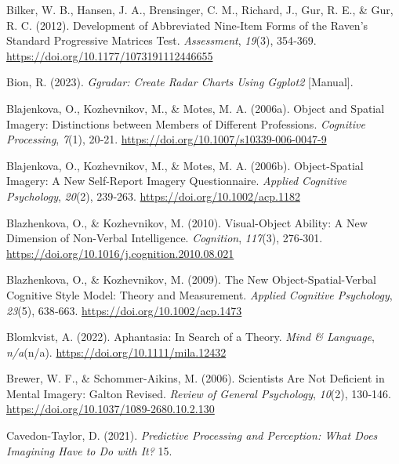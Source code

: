 \documentclass[
  12pt,
]{article}
\newlength{\cslhangindent}
\newlength{\cslentryspacingunit} %
\newenvironment{CSLReferences}[2] %
 {%
  \setlength{\parindent}{0pt}
  \ifodd #1
  \let\oldpar\par
  \def\par{\hangindent=\cslhangindent\oldpar}
  \fi
  \setlength{\parskip}{#2\cslentryspacingunit}
 }%
 {}
\begin{document}
\begin{CSLReferences}{1}{0}
\leavevmode{}%
Bilker, W. B., Hansen, J. A., Brensinger, C. M., Richard, J., Gur, R.
E., \& Gur, R. C. (2012). Development of {Abbreviated Nine-Item Forms}
of the {Raven}'s {Standard Progressive Matrices Test}.
\emph{Assessment}, \emph{19}(3), 354‑369.
\url{https://doi.org/10.1177/1073191112446655}

\leavevmode{}%
Bion, R. (2023). \emph{Ggradar: {Create} Radar Charts Using Ggplot2}
{[}Manual{]}.

\leavevmode{}%
Blajenkova, O., Kozhevnikov, M., \& Motes, M. A. (2006a). Object and
Spatial Imagery: Distinctions between Members of Different Professions.
\emph{Cognitive Processing}, \emph{7}(1), 20‑21.
\url{https://doi.org/10.1007/s10339-006-0047-9}

\leavevmode{}%
Blajenkova, O., Kozhevnikov, M., \& Motes, M. A. (2006b). Object-Spatial
Imagery: A New Self-Report Imagery Questionnaire. \emph{Applied
Cognitive Psychology}, \emph{20}(2), 239‑263.
\url{https://doi.org/10.1002/acp.1182}

\leavevmode{}%
Blazhenkova, O., \& Kozhevnikov, M. (2010). Visual-Object Ability: {A}
New Dimension of Non-Verbal Intelligence. \emph{Cognition},
\emph{117}(3), 276‑301.
\url{https://doi.org/10.1016/j.cognition.2010.08.021}

\leavevmode{}%
Blazhenkova, O., \& Kozhevnikov, M. (2009). The New
Object-Spatial-Verbal Cognitive Style Model: {Theory} and Measurement.
\emph{Applied Cognitive Psychology}, \emph{23}(5), 638‑663.
\url{https://doi.org/10.1002/acp.1473}

\leavevmode{}%
Blomkvist, A. (2022). Aphantasia: {In} Search of a Theory. \emph{Mind \&
Language}, \emph{n/a}(n/a). \url{https://doi.org/10.1111/mila.12432}

\leavevmode{}%
Brewer, W. F., \& Schommer-Aikins, M. (2006). Scientists {Are Not
Deficient} in {Mental Imagery}: {Galton Revised}. \emph{Review of
General Psychology}, \emph{10}(2), 130‑146.
\url{https://doi.org/10.1037/1089-2680.10.2.130}

\leavevmode{}%
Cavedon-Taylor, D. (2021). \emph{Predictive {Processing} and
{Perception}: {What} Does {Imagining} Have to Do with It?} 15.


\end{CSLReferences}
\end{document}

